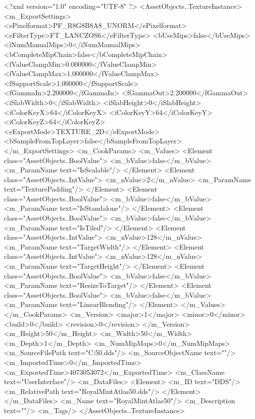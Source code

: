 <?xml version="1.0" encoding="UTF-8" ?>
<AssetObjects..TextureInstance>
	<m_ExportSettings>
		<ePixelformat>PF_R8G8B8A8_UNORM</ePixelformat>
		<eFilterType>FT_LANCZOS6</eFilterType>
		<bUseMips>false</bUseMips>
		<iNumManualMips>0</iNumManualMips>
		<bCompleteMipChain>false</bCompleteMipChain>
		<fValueClampMin>0.000000</fValueClampMin>
		<fValueClampMax>1.000000</fValueClampMax>
		<fSupportScale>1.000000</fSupportScale>
		<fGammaIn>2.200000</fGammaIn>
		<fGammaOut>2.200000</fGammaOut>
		<iSlabWidth>0</iSlabWidth>
		<iSlabHeight>0</iSlabHeight>
		<iColorKeyX>64</iColorKeyX>
		<iColorKeyY>64</iColorKeyY>
		<iColorKeyZ>64</iColorKeyZ>
		<eExportMode>TEXTURE_2D</eExportMode>
		<bSampleFromTopLayer>false</bSampleFromTopLayer>
	</m_ExportSettings>
	<m_CookParams>
		<m_Values>
			<Element class="AssetObjects..BoolValue">
				<m_bValue>false</m_bValue>
				<m_ParamName text="IsScalable"/>
			</Element>
			<Element class="AssetObjects..IntValue">
				<m_nValue>2</m_nValue>
				<m_ParamName text="TexturePadding"/>
			</Element>
			<Element class="AssetObjects..BoolValue">
				<m_bValue>false</m_bValue>
				<m_ParamName text="IsStandalone"/>
			</Element>
			<Element class="AssetObjects..BoolValue">
				<m_bValue>false</m_bValue>
				<m_ParamName text="IsTiled"/>
			</Element>
			<Element class="AssetObjects..IntValue">
				<m_nValue>128</m_nValue>
				<m_ParamName text="TargetWidth"/>
			</Element>
			<Element class="AssetObjects..IntValue">
				<m_nValue>128</m_nValue>
				<m_ParamName text="TargetHeight"/>
			</Element>
			<Element class="AssetObjects..BoolValue">
				<m_bValue>false</m_bValue>
				<m_ParamName text="ResizeToTarget"/>
			</Element>
			<Element class="AssetObjects..BoolValue">
				<m_bValue>false</m_bValue>
				<m_ParamName text="LinearBlending"/>
			</Element>
		</m_Values>
	</m_CookParams>
	<m_Version>
		<major>1</major>
		<minor>0</minor>
		<build>0</build>
		<revision>0</revision>
	</m_Version>
	<m_Height>50</m_Height>
	<m_Width>50</m_Width>
	<m_Depth>1</m_Depth>
	<m_NumMipMaps>0</m_NumMipMaps>
	<m_SourceFilePath text="C:\Users\aaron\Documents\RoyalMintAtlas50.dds"/>
	<m_SourceObjectName text=""/>
	<m_ImportedTime>0</m_ImportedTime>
	<m_ExportedTime>4073053072</m_ExportedTime>
	<m_ClassName text="UserInterface"/>
	<m_DataFiles>
		<Element>
			<m_ID text="DDS"/>
			<m_RelativePath text="RoyalMintAtlas50.dds"/>
		</Element>
	</m_DataFiles>
	<m_Name text="RoyalMintAtlas50"/>
	<m_Description text=""/>
	<m_Tags/>
</AssetObjects..TextureInstance>

